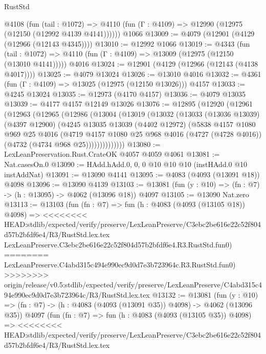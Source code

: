 \begin{lexlean}{RustStd}
\begin{coremodule}
{\begin{coremodule}
{{{{{{{{{{{{{{    @4108
      (fun (tail : @1072) =>
      @4110 (fun (Γ : @4109) => @12990 (@12975 (@12150 (@12992 @4139 @4141))))))
    @1066
@13009 := @4079 (@12901 (@4129 (@12966 (@12143 @4345))))
@13010 := @12992 @1066
@13019 := @4343
    (fun (tail : @1072) => @4110 (fun (Γ : @4109) => @13009 (@12975 (@12150 (@13010 @4141)))))
    @4016
@13024 := @12901 (@4129 (@12966 (@12143 (@4138 @4017))))
@13025 := @4079 @13024
@13026 := @13010 @4016
@13032 := @4361 (fun (Γ : @4109) => @13025 (@12975 (@12150 @13026))) @4157
@13033 := @4245 @13024
@13035 := @12973 (@4170 @4157)
@13036 := @4079 @13035
@13039 := @4177 @4157 @12149 @13026
@13076 := @12895
    (@12920
      (@12961
        (@12963
          (@12965
            (@12986
              (@13004
                (@13019
                  (@13032
                    (@13033
                      (@13036 @13039)
                      (@4397 @12900)
                      (@4245
                        @13035
                        @13039
                        (@4402 @12972)
                        (@5838
                          @4157
                          @1080
                          @969
                          @25
                          @4016
                          (@4719
                            @4157
                            @1080
                            @25
                            @968
                            @4016
                            (@4727 (@4728 @4016))
                            (@4732 (@4734 @968 @25))))))))))))))
@13080 := LexLeanPreservation.Rust.CrateOK @4057 @4059 @4061
@13081 := Nat.casesOn.{0}
@13090 := HAdd.hAdd.{0, 0, 0} @10 @10 @10 (instHAdd.{0} @10 instAddNat)
@13091 := @13090 @4141
@13095 := @4083 (@4093 (@13091 @18)) @4098
@13096 := @13090 @4139
@13103 := @13081 (fun (y : @10) => (fn : @7) -> (h : @13095) -> @4062 (@13096 @18)) @4097
@13105 := @13090 Nat.zero
@13113 := @13103
    (fun (fn : @7) =>
    fun (h : @4083 (@4093 (@13105 @18)) @4098) =>
<<<<<<<< HEAD:stdlib/expected/verify/preserve/LexLeanPreserve/C3ebc2be616e22c52f804d57b2bfdf6e4/R3/RustStd.lex.tex
    LexLeanPreserve.C3ebc2be616e22c52f804d57b2bfdf6e4.R3.RustStd.fun0)
========
    LexLeanPreserve.C4abd315c494e990ec9d0d7e3b723964c.R3.RustStd.fun0)
>>>>>>>> origin/release/v0.5:stdlib/expected/verify/preserve/LexLeanPreserve/C4abd315c494e990ec9d0d7e3b723964c/R3/RustStd.lex.tex
@13132 := @13081
    (fun (y : @10) => (fn : @7) -> (h : @4083 (@4093 (@13091 @35)) @4098) -> @4062 (@13096 @35))
    @4097
    (fun (fn : @7) =>
    fun (h : @4083 (@4093 (@13105 @35)) @4098) =>
<<<<<<<< HEAD:stdlib/expected/verify/preserve/LexLeanPreserve/C3ebc2be616e22c52f804d57b2bfdf6e4/R3/RustStd.lex.tex
}}}}}}}}}}}}}}
\end{coremodule}}
\end{coremodule}
\end{lexlean}
